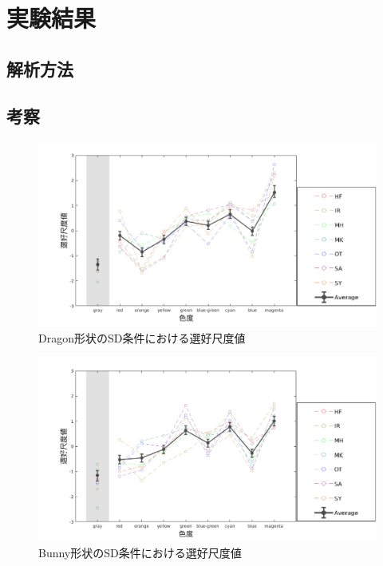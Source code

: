 \section{実験結果}
    \subsection{解析方法}


    \newpage
    \subsection{考察}
        
        \begin{figure}[h]
            \centering
            \includegraphics[width=15.0cm]{./img/ex1_res_DSD_p.png}
            \caption{Dragon形状のSD条件における選好尺度値}
            \label{ex1_DSD}
        \end{figure}

        \begin{figure}[h]
            \centering
            \includegraphics[width=15.0cm]{./img/ex1_res_BSD_p.png}
            \caption{Bunny形状のSD条件における選好尺度値}
            \label{ex1_BSD}
        \end{figure}
        
